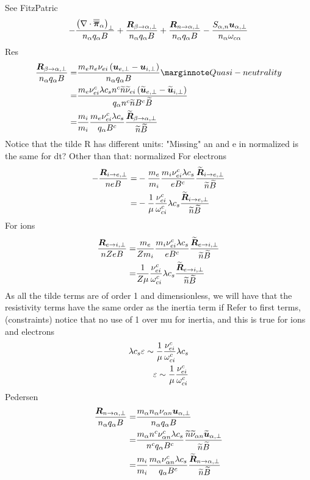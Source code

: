 See FitzPatric
%
\begin{align*}
- \frac{ \left(\nabla\cdot\boldsymbol{\overline{\overline{\pi}}}_\alpha\right)_\perp }{n_\alpha  q_\alpha B}
+ \frac{ \boldsymbol{R}_{\beta \to \alpha,\perp} }{n_\alpha q_\alpha B}
+ \frac{ \boldsymbol{R}_{n \to \alpha,\perp} }{n_\alpha q_\alpha B}
- \frac{ S_{\alpha,n}\boldsymbol{u}_{\alpha,\perp} }{n_\alpha \omega_{c\alpha}}
\end{align*}
%
Res
%
\begin{align*}
\frac{ \ve{R}_{\beta \to \a,\perp} }{n_\a q_\a B}
=&
\frac{ m_en_e\nu_{ei}\L(\ve{u}_{e,\perp}-\ve{u}_{i,\perp}\R) }{n_\a q_\a B}
\note{Quasi-neutrality}
\\
=&
\frac{ m_e\nu^c_{ei}\lambda c_sn^c\wt{n}\wt{\nu}_{ei}\L(\wt{\ve{u}}_{e,\perp}-\wt{\ve{u}}_{i,\perp}\R) }{q_\a n^c\wt{n}B^c\wt{B}}
\\
=&
\frac{m_i}{m_i}\frac{ m_e\nu^c_{ei}\lambda c_s}{q_\a B^c} \frac{\wt{\ve{R}}_{\beta \to \a,\perp} }{\wt{n}\wt{B}}
\end{align*}
%
Notice that the tilde R has different units: "Missing" an and e in normalized
is the same for dt? Other than that: normalized
For electrons
%
\begin{align*}
- \frac{ \boldsymbol{R}_{i \to e,\perp} }{n e B}
=&
-\frac{m_e}{m_i}\frac{ m_i\nu^c_{ei}\lambda c_s}{e  B^c} \frac{\widetilde{ \boldsymbol{R}}_{i \to e,\perp} }{\widetilde{ n}\widetilde{ B}}
\\
=&
-\frac{1}{\mu}\frac{\nu^c_{ei}}{\omega^c_{ci}}\lambda c_s \frac{\widetilde{ \boldsymbol{R}}_{i \to e,\perp} }{\widetilde{ n}\widetilde{ B}}
\end{align*}
%
For ions
%
\begin{align*}
    \frac{ \boldsymbol{R}_{e \to i,\perp} }{n Ze B}
    =&
    \frac{m_e}{Zm_i}\frac{ m_i\nu^c_{ei}\lambda c_s}{e  B^c} \frac{\widetilde{ \boldsymbol{R}}_{e \to i,\perp} }{\widetilde{ n}\widetilde{ B}}
\\
=&
\frac{1}{Z\mu}\frac{\nu^c_{ei}}{\omega^c_{ci}}\lambda c_s \frac{\widetilde{ \boldsymbol{R}}_{e \to i,\perp} }{\widetilde{ n}\widetilde{ B}}
\end{align*}
%
As all the tilde terms are of order 1 and dimensionless, we will have that the resistivity terms have the same order as the inertia term if
Refer to first terms, (constraints)
notice that no use of 1 over mu for inertia, and this is true for ions and electrons
%
\begin{align*}
    \lambda
 c_s
 \varepsilon
 \sim
    \frac{1}{\mu}\frac{\nu^c_{ei}}{\omega^c_{ci}}\lambda c_s
    \\
 \varepsilon
 \sim
 \frac{1}{\mu}
    \frac{\nu^c_{ei}}{\omega^c_{ci}}
\end{align*}
%
Pedersen
%
\begin{align*}
\frac{ \boldsymbol{R}_{n \to \alpha,\perp} }{n_\alpha q_\alpha B}
=&
\frac{ m_\alpha n_\alpha \nu_{\alpha n} \boldsymbol{u}_{\alpha,\perp}}{n_\alpha q_\alpha B}
\\
=&
\frac{ m_\alpha n^c \nu^c_{\alpha n}\lambda c_s}{n^c q_\alpha B^c}
\frac{\widetilde{ n}\widetilde{ \nu}_{\alpha n}\widetilde{ \boldsymbol{u}}_{\alpha,\perp} }{\widetilde{ n} \widetilde{ B}}
\\
=&
\frac{m_i}{m_i}
\frac{ m_\alpha \nu^c_{\alpha n}\lambda c_s}{ q_\alpha B^c}
\frac{\widetilde{ \boldsymbol{R}}_{n \to \alpha,\perp} }{\widetilde{ n} \widetilde{ B}}
\end{align*}
